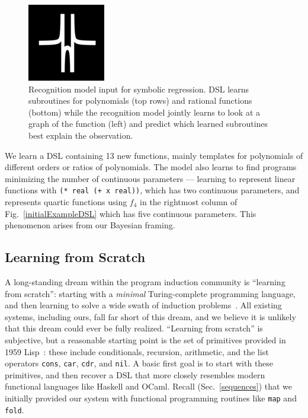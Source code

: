 \documentclass{article}
\newcommand{\code}[1]{{\footnotesize\texttt{#1}}}
\begin{document}
\begin{figure}
\begin{minipage}[c]{0.3\columnwidth}
    \includegraphics[width = \functionSize]{figures/functions/149.png}
  \end{minipage}
  \begin{minipage}[c]{0.69\columnwidth}    
    \caption{Recognition model input for symbolic regression. DSL learns subroutines for polynomials (top rows) and rational functions (bottom) while the recognition  model jointly learns to look at a graph of the function (left) and predict which learned subroutines best explain the observation.}\label{functions}\vspace{-1cm}
        \end{minipage}
\end{figure}
We learn a DSL containing 13 new functions,
mainly templates for polynomials of different orders or ratios of polynomials.
The model also learns to find programs minimizing the number of continuous parameters ---
learning to represent linear functions with 
\code{(* real (+ x real))}, which has two continuous parameters, and represents quartic functions using $f_4$ in the rightmost column of Fig.~\ref{initialExampleDSL}
which has five continuous parameters.
This phenomenon arises from our Bayesian framing.

\subsection{Learning from Scratch}
A long-standing dream within the program induction community
is ``learning from scratch'': starting with a \emph{minimal} Turing-complete programming language,
and then learning to solve a wide swath of
induction problems~\cite{solomonoff1964formal}.
All existing systems,
including ours,
fall far short of this dream,
and we believe it is unlikely
that this dream could ever be fully realized.
``Learning from scratch'' is subjective, but a reasonable
starting point is the set of primitives provided in 1959
Lisp~\cite{mccarthy1960recursive}: these include
conditionals, recursion, arithmetic, and the 
list operators \code{cons}, \code{car}, \code{cdr}, and \code{nil}.
A  basic first goal is to start with
these primitives,
and then recover a DSL that
more closely resembles modern functional languages like Haskell and OCaml.
Recall (Sec.~\ref{sequences})
that we initially provided our system with functional programming routines like
\code{map} and \code{fold}.
\end{document}
